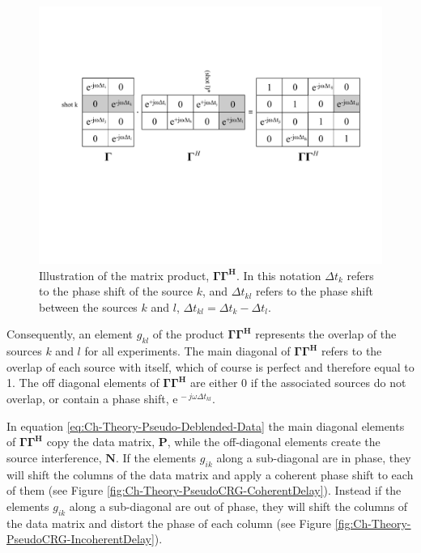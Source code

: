 \begin{figure}
	\centering
	\includegraphics[width = \textwidth]{Plots/GGH}
	\caption{Illustration of the matrix product, $\mathbf{\Gamma \Gamma^H}$. In this notation $\Delta t_k$ refers to the phase shift of the source $k$, and $\Delta t_{kl}$ refers to the phase shift between the sources $k$ and $l$, $\Delta t_{kl} = \Delta t_k - \Delta t_l$.}
	\label{fig:Ch-Theory-GGH}
\end{figure}

Consequently, an element $g_{kl}$ of the product $\mathbf{\Gamma \Gamma ^H}$ represents the overlap of the sources $k$ and $l$ for all experiments. The main diagonal of $\mathbf{\Gamma \Gamma ^H}$ refers to the overlap of each source with itself, which of course is perfect and therefore equal to 1. The off diagonal elements of $\mathbf{\Gamma \Gamma ^H}$ are either 0 if the associated sources do not overlap, or contain a phase shift, $\mathrm{e}^{\, -j \omega \Delta t_{kl}}$.

In equation \ref{eq:Ch-Theory-Pseudo-Deblended-Data} the main diagonal elements of $\mathbf{\Gamma \Gamma ^H}$ copy the data matrix, $\mathbf{P}$, while the off-diagonal elements create the source interference, $\mathbf{N}$. If the elements $g_{ik}$ along a sub-diagonal are in phase, they will shift the columns of the data matrix and apply a coherent phase shift to each of them (see Figure \ref{fig:Ch-Theory-PseudoCRG-CoherentDelay}). Instead if the elements $g_{ik}$ along a sub-diagonal are out of phase, they will shift the columns of the data matrix and distort the phase of each column (see Figure \ref{fig:Ch-Theory-PseudoCRG-IncoherentDelay}). 

